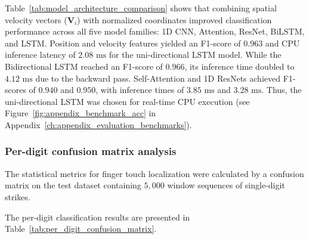 Table~\ref{tab:model_architecture_comparison} shows that combining spatial velocity vectors ($\mathbf{V}_i$) with normalized coordinates improved classification performance across all five model families: 1D CNN, Attention, ResNet, BiLSTM, and LSTM. Position and velocity features yielded an F1-score of $0.963$ and CPU inference latency of $2.08\text{ ms}$ for the uni-directional LSTM model. While the Bidirectional LSTM reached an F1-score of $0.966$, its inference time doubled to $4.12\text{ ms}$ due to the backward pass. Self-Attention and 1D ResNets achieved F1-scores of $0.940$ and $0.950$, with inference times of $3.85\text{ ms}$ and $3.28\text{ ms}$. Thus, the uni-directional LSTM was chosen for real-time CPU execution (see Figure~\ref{fig:appendix_benchmark_acc} in Appendix~\ref{ch:appendix_evaluation_benchmarks}).

\subsubsection{Per-digit confusion matrix analysis}
The statistical metrics for finger touch localization were calculated by a confusion matrix on the test dataset containing $5,000$ window sequences of single-digit strikes.

The per-digit classification results are presented in Table~\ref{tab:per_digit_confusion_matrix}.

\begin{table}[htbp]
\centering
\caption{Per-digit touch classification performance metrics.}
\label{tab:per_digit_confusion_matrix}
\end{table}

